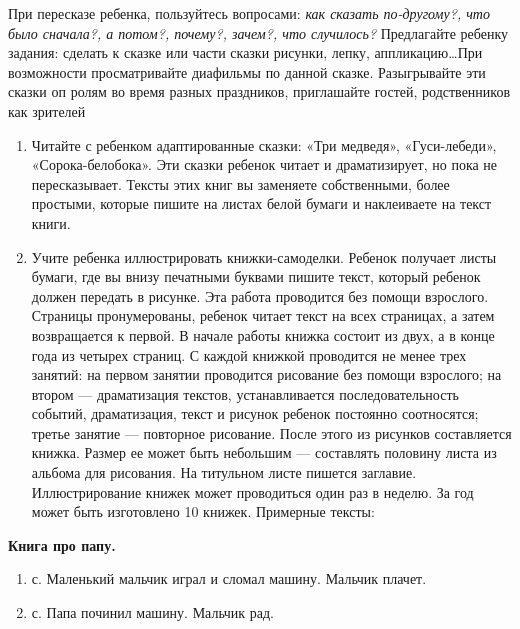\documentclass[a5paper]{book}
\renewcommand{\emph}[1]{\textit{#1}}
\begin{document}
При пересказе ребенка, пользуйтесь вопросами: \emph{как сказать
по-другому?, что было сначала?, а потом?, почему?, зачем?, что
случилось?} Предлагайте ребенку задания: сделать к сказке или части
сказки рисунки, лепку, аппликацию\ldots При возможности просматривайте
диафильмы по данной сказке. Разыгрывайте эти сказки оп ролям во время
разных праздников, приглашайте гостей, родственников как зрителей


\begin{enumerate}
\def\labelenumi{\arabic{enumi}.}
\setcounter{enumi}{5}
\item
  
  Читайте с ребенком адаптированные сказки: «Три медведя»,
  «Гуси-лебеди», «Сорока-белобока». Эти сказки ребенок читает и
  драматизирует, но пока не пересказывает. Тексты этих книг вы заменяете
  собственными, более простыми, которые пишите на листах белой бумаги и
  наклеиваете на текст книги.
  
\item
  
  Учите ребенка иллюстрировать книжки-самоделки. Ребенок получает листы
  бумаги, где вы внизу печатными буквами пишите текст, который ребенок
  должен передать в рисунке. Эта работа проводится без помощи взрослого.
  Страницы пронумерованы, ребенок читает текст на всех страницах, а
  затем возвращается к первой. В начале работы книжка состоит из двух, а
  в конце года из четырех страниц. С каждой книжкой проводится не менее
  трех занятий: на первом занятии проводится рисование без помощи
  взрослого; на втором --- драматизация текстов, устанавливается
  последовательность событий, драматизация, текст и рисунок ребенок
  постоянно соотносятся; третье занятие --- повторное рисование. После
  этого из рисунков составляется книжка. Размер ее может быть небольшим
  --- составлять половину листа из альбома для рисования. На титульном
  листе пишется заглавие. Иллюстрирование книжек может проводиться один
  раз в неделю. За год может быть изготовлено 10 книжек. Примерные
  тексты:
  
\end{enumerate}


\textbf{Книга про папу.}


\begin{enumerate}
\def\labelenumi{\arabic{enumi}.}
\item
  
  с. Маленький мальчик играл и сломал машину. Мальчик плачет.
  
\item
  
  с. Папа починил машину. Мальчик рад.
  
\end{enumerate}
\end{document}
